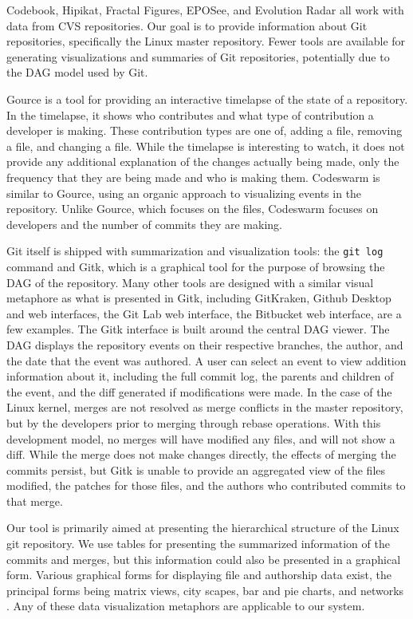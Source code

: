 Codebook, Hipikat, Fractal Figures, EPOSee, and Evolution Radar all work
with data from CVS repositories. Our goal is to provide information
about Git repositories, specifically the Linux master repository. Fewer
tools are available for generating visualizations and summaries of Git
repositories, potentially due to the DAG model used by Git.

Gource is a tool for providing an interactive timelapse of the state of
a repository\cite{Caudwell2010}. In the timelapse, it shows who
contributes and what type of contribution a developer is making. These
contribution types are one of, adding a file, removing a file, and
changing a file. While the timelapse is interesting to watch, it does
not provide any additional explanation of the changes actually being
made, only the frequency that they are being made and who is making
them. Codeswarm\cite{ogawa09} is similar to Gource, using an organic approach to
visualizing events in the repository. Unlike Gource, which focuses on
the files, Codeswarm focuses on developers and the number of commits
they are making.

Git itself is shipped with summarization and visualization tools: the
\verb|git log| command and Gitk, which is a graphical tool for the
purpose of browsing the DAG of the repository. Many other tools are
designed with a similar visual metaphore as what is presented in Gitk,
including GitKraken, Github Desktop and web interfaces, the Git Lab web
interface, the Bitbucket web interface, are a few examples. The Gitk
interface is built around the central DAG viewer. The DAG displays the
repository events on their respective branches, the author, and the date
that the event was authored. A user can select an event to view addition
information about it, including the full commit log, the parents and
children of the event, and the diff generated if modifications were
made. In the case of the Linux kernel, merges are not resolved as merge
conflicts in the master repository, but by the developers prior to
merging through rebase operations. With this development model, no
merges will have modified any files, and will not show a diff. While the
merge does not make changes directly, the effects of merging the commits
persist, but Gitk is unable to provide an aggregated view of the files
modified, the patches for those files, and the authors who contributed
commits to that merge.

Our tool is primarily aimed at presenting the hierarchical structure of
the Linux git repository. We use tables for presenting the summarized
information of the commits and merges, but this information could also
be presented in a graphical form. Various graphical forms for displaying
file and authorship data exist, the principal forms being matrix views,
city scapes, bar and pie charts, and networks \cite{Eick2002}. Any of
these data visualization metaphors are applicable to our system.

